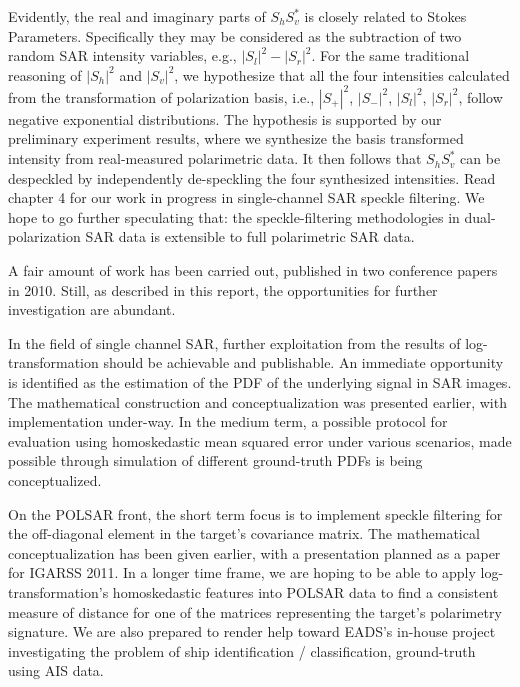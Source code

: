 Evidently, the real and imaginary parts of $S_hS_v^*$ is closely related to Stokes Parameters.
Specifically they may be considered as the subtraction of two random SAR intensity variables, e.g., $|S_l|^2 - |S_r|^2$. 
For the same traditional reasoning of $|S_h|^2$ and $|S_v|^2$, we hypothesize that all the four intensities calculated from the transformation of polarization basis, i.e., $|S_+|^2$, $|S_-|^2$, $|S_l|^2$, $|S_r|^2$, follow negative exponential distributions. 
The hypothesis is supported by our preliminary experiment results, where we synthesize the basis transformed intensity from real-measured polarimetric data.
It then follows that $S_hS_v^*$ can be despeckled by independently de-speckling the four synthesized intensities.
Read chapter 4 for our work in progress in single-channel SAR speckle filtering.
We hope to go further speculating that: the speckle-filtering methodologies in dual-polarization SAR data is extensible to full polarimetric SAR data.

A fair amount of work has been carried out, published in two conference papers in 2010.
Still, as described in this report, the opportunities for further investigation are abundant. 

In the field of single channel SAR, further exploitation from the results of log-transformation should be achievable and publishable.
An immediate opportunity is identified as the estimation of the PDF of the underlying signal in SAR images. 
The mathematical construction and conceptualization was presented earlier, with implementation under-way.
In the medium term, a possible protocol for evaluation using homoskedastic mean squared error under various scenarios, made possible through simulation of different ground-truth PDFs is being conceptualized.

On the POLSAR front, the short term focus is to implement speckle filtering for the off-diagonal element in the target's covariance matrix.
The mathematical conceptualization has been given earlier, with a presentation planned as a paper for IGARSS 2011.
In a longer time frame, we are hoping to be able to apply log-transformation's homoskedastic features into POLSAR data to find a consistent measure of distance for one of the matrices representing the target's polarimetry signature.
We are also prepared to render help toward EADS's in-house project investigating the problem of ship identification / classification, ground-truth using AIS data. 

